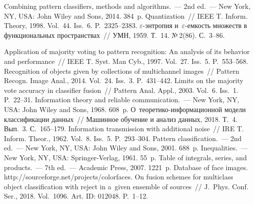 \begin{multicols}{2}

\renewcommand{\bibname}{\protect\rmfamily Литература}

{\small\frenchspacing
{\baselineskip=10.5pt
\begin{thebibliography}{99}
 Combining pattern classifiers, methods and algorithms.~--- 2nd ed.~---
  New York, NY, USA: John Wiley and Sons, 2014. 384~p.
 Quantization~// IEEE T. Inform. Theory, 1998. 
Vol.~44. Iss.~6. P.~2325--2383.
$\varepsilon$-энтропия и~$\varepsilon$-ем\-кость 
множеств в функциональных пространствах~// УМН, 1959. Т.~14. №\,2(86). С.~3--86.

 Application of majority voting to pattern recognition: An analysis of its behavior and 
performance~// IEEE T. Syst. Man Cyb., 1997. Vol.~27. Iss.~5. P.~553--568.
 Recognition of objects given by collections of multichannel images~// 
Pattern Recogn. Image Anal., 2014. Vol.~24. Iss.~3. P.~431--442.
 Limits on the majority vote accuracy in classifier fusion~// 
Pattern Anal. Appl., 2003. Vol.~6. Iss.~1. P.~22--31.
 Information theory and reliable communication.~---
  New York, NY, USA: John Wiley and Sons, 1968. 
608~p.
 О~тео\-ре\-ти\-ко-ин\-фор\-ма\-ци\-он\-ной 
модели классификации данных~// 
Машинное обучение и анализ данных, 2018. Т.~4. Вып.~3. С.~165--179.
 Information transmission with additional noise~// IRE T. 
Inform. Theor., 1962. Vol.~8. Iss.~5. P.~293--304.
 Pattern classification.~--- 2nd ed.~--- New York, NY, USA: John Wiley and Sons, 2001. 688~p.
 Inequalities.~--- New York, NY, USA: Springer-Verlag, 1961. 55~p.
 Table of integrals, series, and products.~---
7th ed.~--- Academic Press, 
2007. 1221~p.
Database of face images. {\sf http://sourceforge.net/\linebreak projects/colorfaces}.
On fusion schemes for multiclass object classification with reject in 
a~given ensemble of sources~// J.~Phys. Conf. Ser., 2018. Vol.~1096.
 Art. ID: 012048.  P.~1--12. 
\end{thebibliography}
} }

\end{multicols}

